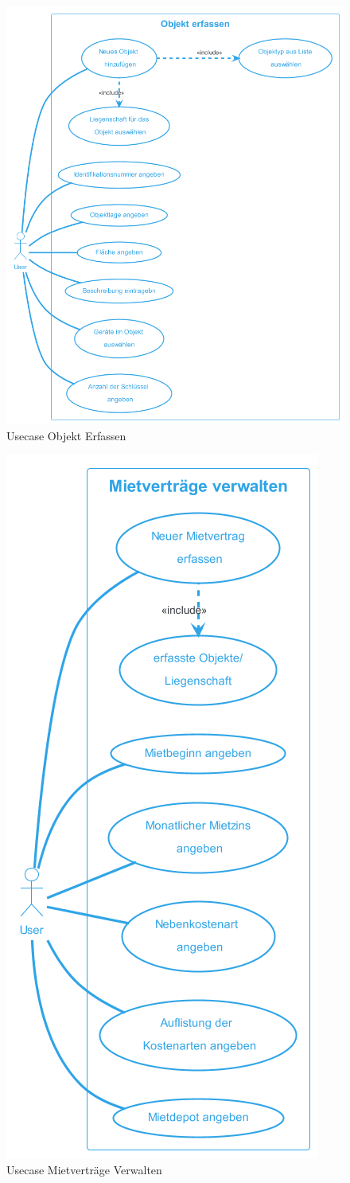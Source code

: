 \begin{figure}[H]
  \begin{center}
    \includegraphics[width=0.8\linewidth]{content/diagrams/out/usecase/objektErfassen/ObjektErfassen.png}
    \caption{Usecase Objekt Erfassen}
  \end{center}
  \label{objekt}
\end{figure}

\begin{figure}[H]
  \begin{center}
    \includegraphics[width=0.45\linewidth]{content/diagrams/out/usecase/mietverträgeVerwalten/MietverträgeVerwalten.png}
    \caption{Usecase Mietverträge Verwalten}
  \end{center}
  \label{MietvertraegeVerwalten}
\end{figure}

